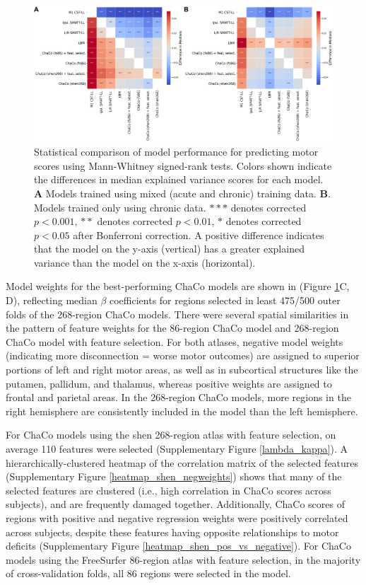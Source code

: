 \documentclass[10pt]{article}
\begin{document}
\begin{figure}[ht]
\centering
\includegraphics[width=1\linewidth]{figures/Analysis1_matrix.png}
\caption{Statistical comparison of model performance for predicting motor scores using Mann-Whitney signed-rank tests. Colors shown indicate the differences in median explained variance scores for each model. \textbf{A} Models trained using mixed (acute and chronic) training data. \textbf{B}. Models trained only using chronic data. $***$ denotes corrected $p < 0.001$, $**$ denotes corrected $p < 0.01$, $*$ denotes corrected $p < 0.05$ after Bonferroni correction. A positive difference indicates that the model on the y-axis (vertical) has a greater explained variance than the model on the x-axis (horizontal).
 }
\label{analysis1}
\end{figure}

Model weights for the best-performing ChaCo models are shown in (Figure \ref{analysis1}C, D), reflecting median $\beta$ coefficients for regions selected in least 475/500 outer folds of the 268-region ChaCo models. There were several spatial similarities in the pattern of feature weights for the 86-region ChaCo model and 268-region ChaCo model with feature selection. For both atlases, negative model weights (indicating more disconnection = worse motor outcomes) are assigned to superior portions of left and right motor areas, as well as in subcortical structures like the putamen, pallidum, and thalamus, whereas positive weights are assigned to frontal and parietal areas. In the 268-region ChaCo models, more regions in the right hemisphere are consistently included in the model than the left hemisphere. 


For ChaCo models using the shen 268-region atlas with feature selection, on average 110 features were selected (Supplementary Figure \ref{lambda_kappa}). A hierarchically-clustered heatmap of the correlation matrix of the selected features (Supplementary Figure \ref{heatmap_shen_negweights}) shows that many of the selected features are clustered (i.e., high correlation in ChaCo scores across subjects), and are frequently damaged together. Additionally, ChaCo scores of regions with positive and negative regression weights were positively correlated across subjects, despite these features having opposite relationships to motor deficits (Supplementary Figure \ref{heatmap_shen_pos_vs_negative}). For ChaCo models using the FreeSurfer 86-region atlas with feature selection, in the majority of cross-validation folds, all 86 regions were selected in the model. 
\end{document}
